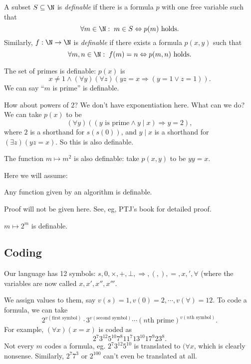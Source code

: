 \documentclass[a4paper]{article}
\begin{document}
\begin{defi}[Definability]
  A subset $S\subseteq \N$ is \emph{definable} if there is a formula $p$ with one free variable such that
  \[
    \forall m\in \N:\; m\in S \Leftrightarrow p(m)\text{ holds}.
  \]
  Similarly, $f: \N \to \N$ is \emph{definable} if there exists a formula $p(x, y)$ such that
  \[
    \forall m, n\in \N:\; f(m) = n \Leftrightarrow p(m, n)\text{ holds}.
  \]
\end{defi}

\begin{eg}
  The set of primes is definable: $p(x)$ is
  \[
    x\not = 1 \wedge (\forall y)(\forall z)(yz = x \Rightarrow (y = 1\vee z = 1)).
  \]
  We can say ``$m$ is prime'' is definable.

  How about powers of $2$? We don't have exponentiation here. What can we do? We can take $p(x)$ to be
  \[
    (\forall y)((y\text{ is prime}\wedge y \mid x) \Rightarrow y = 2),
  \]
  where $2$ is a shorthand for $s(s(0))$, and $y\mid x$ is a shorthand for $(\exists z)(yz = x)$. So this is also definable.

  The function $m\mapsto m^2$ is also definable: take $p(x, y)$ to be $yy = x$.
\end{eg}

Here we will assume:
\begin{fact}
  Any function given by an algorithm is definable.
\end{fact}
Proof will not be given here. See, eg, PTJ's book for detailed proof.

\begin{eg}
  $m\mapsto 2^m$ is definable.
\end{eg}

\subsection*{Coding}
Our language has 12 symbols: $s, 0, \times, +, \bot, \Rightarrow, (, ), =, x, ', \forall$ (where the variables are now called $x, x', x'', x'''$.

We assign values to them, say $v(s) = 1, v(0) = 2, \cdots, v(\forall) = 12$. To code a formula, we can take
\[
  2^{v(\text{first symbol})}\cdot 3^{v(\text{second symbol})}\cdots (n\text{th prime})^{v(n\text{th symbol})}.
\]
For example, $(\forall x)(x = x)$ is coded as
\[
  2^7 3^{12}5^{10}7^8 11^7 13^{10}17^9 23^8.
\]
Not every $m$ codes a formula, eg. $2^7 3^{12}5^{10}$ is translated to $(\forall x$, which is clearly nonsense. Similarly, $2^7 7^3$ or $2^{100}$ can't even be translated at all.
\end{document}
